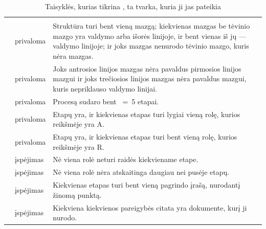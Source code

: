 \begin{xltabular}{\textwidth}{@{}L{34mm}L{17mm}Y@{}}
\caption{Taisyklės, kurias tikrina , ta tvarka, kuria ji jas pateikia}\label{tab:programme:govrules}\\
\toprule
{} &  &  \\
\midrule
\endfirsthead
\toprule
{} &  &  \\
\midrule
\endhead
\bottomrule
\endlastfoot
{} & privaloma & Struktūra turi bent vieną mazgą; kiekvienas mazgas be tėvinio mazgo yra valdymo arba išorės linijoje, ir bent vienas iš jų --- valdymo linijoje; ir joks mazgas nenurodo tėvinio mazgo, kuris nėra mazgas. \\
 & privaloma & Joks antrosios linijos mazgas nėra pavaldus pirmosios linijos mazgui ir joks trečiosios linijos mazgas nėra pavaldus mazgui, kuris nepriklauso valdymo linijai. \\
 & privaloma & Procesą sudaro bent ~=~5 etapai. \\
 & privaloma & Etapų yra, ir kiekvienas etapas turi lygiai vieną rolę, kurios reikšmėje yra A. \\
 & privaloma & Etapų yra, ir kiekvienas etapas turi bent vieną rolę, kurios reikšmėje yra R. \\
 & įspėjimas & Nė viena rolė neturi raidės kiekviename etape. \\
 & įspėjimas & Nė viena rolė nėra atskaitinga daugiau nei pusėje etapų. \\
 & įspėjimas & Kiekvienas etapas turi bent vieną pagrindo įrašą, nurodantį žinomą punktą. \\
 & įspėjimas & Kiekviena kiekvienos pareigybės citata yra dokumente, kurį ji nurodo. \\
\end{xltabular}

